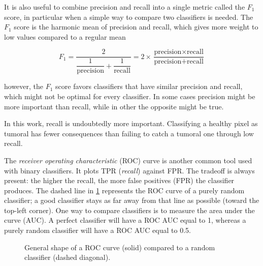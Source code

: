 It is also useful to combine precision and recall into a single metric called the $F_1$ score, in particular when a simple way to compare two classifiers is needed. The $F_1$ score is the harmonic mean of precision and recall, which gives more weight to low values compared to a regular mean

\begin{equation}
    F_1 = \frac{2}{\dfrac{1}{\text{precision}} + \dfrac{1}{\text{recall}}} = 2 \times \frac{\text{precision} \times \text{recall}}{\text{precision} + \text{recall}}
\end{equation}

however, the $F_1$ score favors classifiers that have similar precision and recall, which might not be optimal for every classifier. In some cases precision might be more important than recall, while in other the opposite might be true.

In this work, recall is undoubtedly more important. Classifying a healthy pixel as tumoral has fewer consequences than failing to catch a tumoral one through low recall.

The \textit{receiver operating characteristic} (ROC) curve is another common tool used with binary classifiers. It plots TPR (\textit{recall}) against FPR. The tradeoff is always present: the higher the recall, the more false positives (FPR) the classifier produces. The dashed line in \cref{fig:roc_curve} represents the ROC curve of a purely random classifier; a good classifier stays as far away from that line as possible (toward the top-left corner). One way to compare classifiers is to measure the area under the curve (AUC). A perfect classifier will have a ROC AUC equal to 1, whereas a purely random classifier will have a ROC AUC equal to 0.5.

\begin{figure}[H]
    \centering
    \caption{General shape of a ROC curve (solid) compared to a random classifier (dashed diagonal).}
    \label{fig:roc_curve}
\end{figure}


